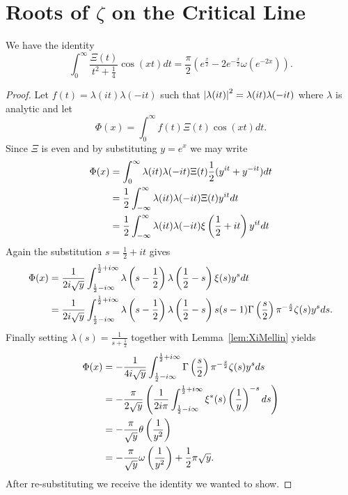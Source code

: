 \section{Roots of $\zeta$ on the Critical Line}


\begin{proposition}
	We have the identity
\begin{equation*}	
	\int _0 ^{\infty} \frac{\Xi(t)}{t^2 + \frac{1}{4}} \cos(xt) dt = \frac{\pi}{2} (e^{\frac{x}{2}} - 2e^{-\frac{x}{2}} \omega(e^{-2x})).
\end{equation*}
\end{proposition}
\begin{proof}
	Let $f(t) = \lambda(it) \lambda(-it)$ such that $\left|\lambda(it)\right|^2 = \lambda(it) \lambda(-it)$ where $\lambda$ is analytic and let
\begin{equation*}
	\Phi(x) = \int _0 ^{\infty} f(t) \Xi(t) \cos(xt) dt.	
\end{equation*}
	Since $\Xi$ is even and by substituting $y = e^x$ we may write
\begin{equation*}
\begin{aligned}
	\Phi(x) 
		&= \int _0 ^\infty \lambda(it) \lambda(-it) \Xi(t) \frac{1}{2}(y^{it} + y^{-it}) dt \\
		&= \frac{1}{2} \int _{-\infty} ^\infty \lambda(it) \lambda(-it) \Xi(t) y^{it} dt \\
		&= \frac{1}{2} \int _{-\infty} ^\infty \lambda(it) \lambda(-it) \xi\left(\frac{1}{2} + it\right) y^{it} dt
\end{aligned}
\end{equation*}
	Again the substitution $s = \frac{1}{2} + it$ gives
\begin{equation*}
\begin{aligned}
	\Phi(x) 
		&= \frac{1}{2 i\sqrt{y}} \int _{\frac{1}{2} -i\infty} ^{\frac{1}{2} + i\infty} \lambda\left(s - \frac{1}{2}\right) \lambda\left(\frac{1}{2} - s\right) \xi(s) y^{s} dt \\
		&= \frac{1}{2 i\sqrt{y}} \int _{\frac{1}{2} -i\infty} ^{\frac{1}{2} + i\infty} \lambda\left(s - \frac{1}{2}\right) \lambda\left(\frac{1}{2} - s\right) s(s - 1) \Gamma\left(\frac{s}{2}\right) \pi ^{-\frac{s}{2}} \zeta(s) y^{s} ds.
\end{aligned}
\end{equation*}
	Finally setting $\lambda(s) = \frac{1}{s + \frac{1}{2}}$ together with Lemma~\ref{lem:XiMellin} yields 
\begin{equation*}
\begin{aligned}
	\Phi(x)
		&= -\frac{1}{4 i\sqrt{y}} \int _{\frac{1}{2} - i\infty} ^{\frac{1}{2} + i\infty} \Gamma\left(\frac{s}{2}\right) \pi ^{-\frac{s}{2}} \zeta(s) y^{s} ds \\
		&= -\frac{\pi}{2 \sqrt{y}} \left(\frac{1}{2 i \pi} \int _{\frac{1}{2} - i\infty} ^{\frac{1}{2} + i\infty} \xi^*(s) \left(\frac{1}{y}\right)^{-s} ds\right) \\
		&= -\frac{\pi}{\sqrt{y}} \theta\left(\frac{1}{y^2}\right) \\
		&= -\frac{\pi}{\sqrt{y}} \omega\left(\frac{1}{y^2}\right) + \frac{1}{2} \pi \sqrt{y}.
\end{aligned}
\end{equation*}
	After re-substituting we receive the identity we wanted to show.
\end{proof}


